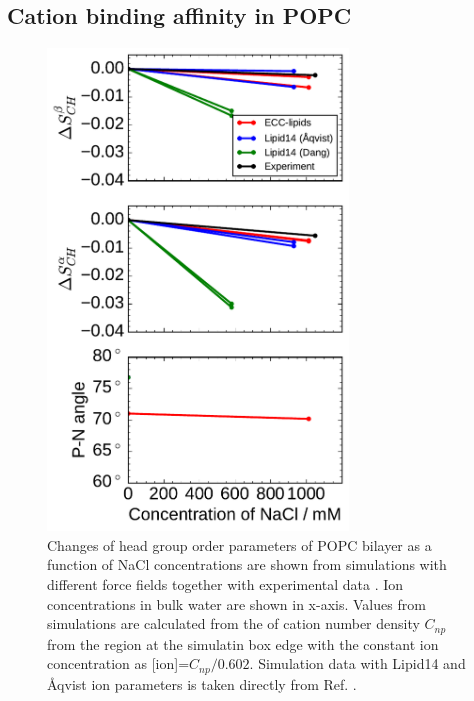 \documentclass[aip,jcp,twocolumn]{revtex4}
\begin{document}
\subsection{Cation binding affinity in POPC}

\begin{figure}[tbp]
  \centering
  \includegraphics[width=8.0cm]{../Fig/ipython_nb/PN_angle_OrdPars-A-B_L14-ECCL17_q80_sig89_NaCl.pdf}
  \caption{\label{fig:delta_ordPar_NaCl}
    Changes of head group order parameters of POPC bilayer as a function of NaCl concentrations
    are shown from simulations with different force fields together with experimental data \cite{akutsu81}. 
    Ion concentrations in bulk water are shown in x-axis. 
    Values from simulations are calculated from the of cation number density $C_{np}$
    from the region at the simulatin box edge with the constant ion concentration as [ion]=$C_{np}/0.602$.
    Simulation data with Lipid14 and \AA{}qvist ion parameters is taken directly from Ref. \cite{catte16}.
  }
\end{figure}
\end{document}
